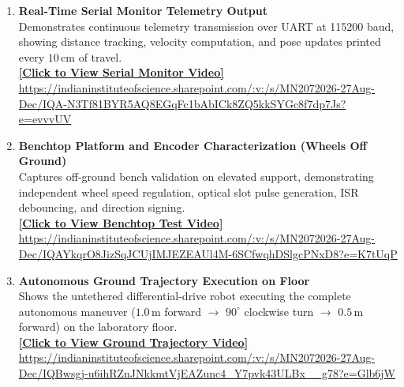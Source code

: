 \documentclass[11pt,a4paper]{article}
\begin{document}
\begin{enumerate}[leftmargin=*,label=\textbf{Video \arabic*:},itemsep=0.18cm,topsep=1pt]
    \item \textbf{Real-Time Serial Monitor Telemetry Output} \\
    Demonstrates continuous telemetry transmission over UART at 115200 baud, showing distance tracking, velocity computation, and pose updates printed every $10\,\text{cm}$ of travel. \\
    \href{https://indianinstituteofscience.sharepoint.com/:v:/s/MN2072026-27Aug-Dec/IQA-N3Tf81BYR5AQ8EGqFc1bAbICk8ZQ5kkSYGc8f7dp7Js?e=evvvUV}{\textbf{[Click to View Serial Monitor Video]}} \\
    {\scriptsize \url{https://indianinstituteofscience.sharepoint.com/:v:/s/MN2072026-27Aug-Dec/IQA-N3Tf81BYR5AQ8EGqFc1bAbICk8ZQ5kkSYGc8f7dp7Js?e=evvvUV}}

    \item \textbf{Benchtop Platform and Encoder Characterization (Wheels Off Ground)} \\
    Captures off-ground bench validation on elevated support, demonstrating independent wheel speed regulation, optical slot pulse generation, ISR debouncing, and direction signing. \\
    \href{https://indianinstituteofscience.sharepoint.com/:v:/s/MN2072026-27Aug-Dec/IQAYkqrO8JizSqJCUjIMJEZEAUl4M-6SCfwqhDSlgcPNxD8?e=K7tUqP}{\textbf{[Click to View Benchtop Test Video]}} \\
    {\scriptsize \url{https://indianinstituteofscience.sharepoint.com/:v:/s/MN2072026-27Aug-Dec/IQAYkqrO8JizSqJCUjIMJEZEAUl4M-6SCfwqhDSlgcPNxD8?e=K7tUqP}}

    \item \textbf{Autonomous Ground Trajectory Execution on Floor} \\
    Shows the untethered differential-drive robot executing the complete autonomous maneuver ($1.0\,\text{m}$ forward $\rightarrow$ $90^\circ$ clockwise turn $\rightarrow$ $0.5\,\text{m}$ forward) on the laboratory floor. \\
    \href{https://indianinstituteofscience.sharepoint.com/:v:/s/MN2072026-27Aug-Dec/IQBwsgj-u6ihRZnJNkkmtVjEAZunc4_Y7pvk43ULBx__g78?e=Glb6jW}{\textbf{[Click to View Ground Trajectory Video]}} \\
    {\scriptsize \url{https://indianinstituteofscience.sharepoint.com/:v:/s/MN2072026-27Aug-Dec/IQBwsgj-u6ihRZnJNkkmtVjEAZunc4_Y7pvk43ULBx__g78?e=Glb6jW}}
\end{enumerate}
\end{document}
